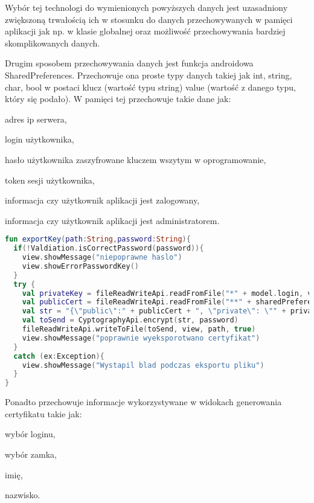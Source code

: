 	Wybór  tej technologi do wymienionych powyższych danych jest uzasadniony zwiększoną trwałością ich w stosunku do danych przechowywanych w pamięci aplikacji jak np.  w klasie globalnej oraz możliwość przechowywania bardziej skomplikowanych danych.
		
	Drugim sposobem przechowywania danych jest funkcja androidowa SharedPreferences. Przechowuje ona proste typy danych takiej jak int, string, char, bool w postaci klucz (wartość typu string) value (wartość z danego typu, który się podało). W pamięci tej przechowuje takie dane jak:
	\begin{itemize*}
		\item adres ip serwera,
		\item login użytkownika,
		\item hasło użytkownika zaszyfrowane kluczem wszytym w oprogramowanie,
		\item token sesji użytkownika,
		\item informacja czy użytkownik aplikacji jest zalogowany,
		\item informacja czy użytkownik aplikacji jest administratorem.	
	\end{itemize*}
\newpage
	\begin{lstlisting}[caption={Funkcja eksportująca klucz szyfrujący.}, label={lst:kod1}, language=Kotlin]
fun exportKey(path:String,password:String){
  if(!Valdiation.isCorrectPassword(password)){
    view.showMessage("niepoprawne haslo")
    view.showErrorPasswordKey()
  }
  try {
    val privateKey = fileReadWriteApi.readFromFile("*" + model.login, view)
    val publicCert = fileReadWriteApi.readFromFile("**" + sharedPreferenceApi.getString(view, EnumChoice.login), view)	
    val str = "{\"public\":" + publicCert + ", \"private\": \"" + privateKey + "\"}"
    val toSend = CyptographyApi.encrypt(str, password)
    fileReadWriteApi.writeToFile(toSend, view, path, true)
    view.showMessage("poprawnie wyeksporotwano certyfikat")
  }
  catch (ex:Exception){
    view.showMessage("Wystapil blad podczas eksportu pliku")
  }
}
	\end{lstlisting}	

	Ponadto przechowuje informacje wykorzystywane w widokach generowania certyfikatu takie jak:
	\begin{itemize*}
		\item wybór loginu,
		\item wybór zamka,
		\item imię, 
		\item nazwisko.
	\end{itemize*}	

